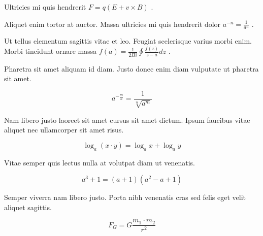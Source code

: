 \documentclass{article}
\begin{document}
Ultricies mi quis hendrerit 
\begin{math}
	F=q\left ( E+v \times B \right )
\end{math}
.\newline

Aliquet enim tortor at auctor. Massa ultricies mi quis hendrerit dolor 
$ a^{-n}=\frac{1}{a^{n}} $
.\newline

Ut tellus elementum sagittis vitae et leo. Feugiat scelerisque varius morbi enim. Morbi tincidunt ornare massa 
\( f\left ( a \right ) = \frac{1}{2\Pi i} \oint \frac{f\left ( z \right )}{z-a} dz \)
.\newline

Pharetra sit amet aliquam id diam. Justo donec enim diam vulputate ut pharetra sit amet.

\[ a^{-\frac{m}{n}}=\frac{1}{\sqrt[n]{a^{m}}} \]

Nam libero justo laoreet sit amet cursus sit amet dictum. Ipsum faucibus vitae aliquet nec ullamcorper sit amet risus.

$$ \log _{a}(x\cdot y)=\log _{a}x+\log _{a}y $$

Vitae semper quis lectus nulla at volutpat diam ut venenatis.

\begin{displaymath}
	a^{3}+1=(a+1)(a^{2}-a+1)
\end{displaymath}

Semper viverra nam libero justo. Porta nibh venenatis cras sed felis eget velit aliquet sagittis.

\begin{equation}
	F_{G}=G\frac{m_1\cdot m_2}{r^2}
\end{equation}
\end{document}
